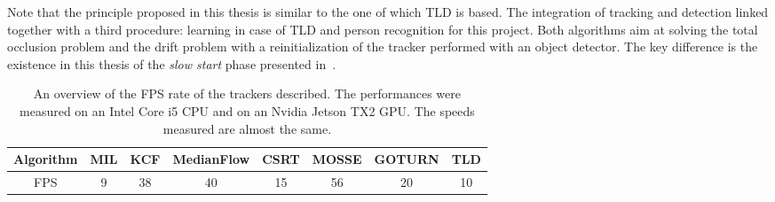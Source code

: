 Note that the principle proposed in this thesis is similar to the one of which TLD is based. The integration of tracking and detection linked together with a third procedure: learning in case of TLD and person recognition for this project. Both algorithms aim at solving the total occlusion problem and the drift problem with a reinitialization of the tracker performed with an object detector. The key difference is the existence in this thesis of the \textit{slow start} phase presented in~.

\begin{table}[]
	\centering
	\begin{tabular}{|c|c|c|c|c|c|c|c|}
		\hline
		Algorithm & MIL & KCF & MedianFlow & CSRT & MOSSE & GOTURN & TLD \\ \hline
		FPS  & 9   & 38  & 40         & 15   & 56    & 20     & 10  \\ \hline
	\end{tabular}
	\captionsetup{margin=0.5cm}
	\caption[The FPS rates of the tracking algorithms.]{An overview of the FPS rate of the trackers described. The performances were measured on an Intel Core i5 CPU and on an Nvidia Jetson TX2 GPU. The speeds measured are almost the same.}
	\label{tab:trackersFPS}
\end{table}